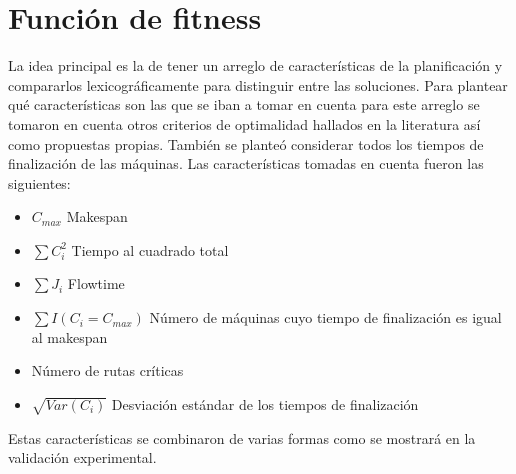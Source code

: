 \section{Función de fitness}
La idea principal es la de tener un arreglo de características de la planificación y compararlos lexicográficamente para distinguir entre las soluciones. Para plantear qué características son las que se iban a tomar en cuenta para este arreglo se tomaron en cuenta otros criterios de optimalidad hallados en la literatura así como propuestas propias. También se planteó considerar todos los tiempos de finalización de las máquinas. Las características tomadas en cuenta fueron las siguientes:
\begin{itemize}
\item $C_{max}$ Makespan 
\item $\sum C_i^2$ Tiempo al cuadrado total 
\item $\sum J_i$ Flowtime 
\item $\sum I(C_i=C_{max})$ Número de máquinas cuyo tiempo de finalización es igual al makespan 
\item Número de rutas críticas 
\item $\sqrt{Var(C_i)}$ Desviación estándar de los tiempos de finalización 
\end{itemize}
Estas características se combinaron de varias formas como se mostrará en la validación experimental. 
